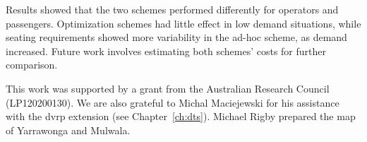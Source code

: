 Results showed that the two schemes performed differently for operators and
passengers. Optimization schemes had little effect in low demand situations, while
seating requirements showed more variability in the ad-hoc scheme, as demand
increased. Future work involves estimating  both schemes' costs for further
comparison.

This work was supported by a grant from the Australian Research Council (LP120200130). We are also grateful to Michal Maciejewski for his assistance with the \gls{dvrp} extension (see Chapter~\ref{ch:dts}). Michael Rigby prepared the map of Yarrawonga and Mulwala.
